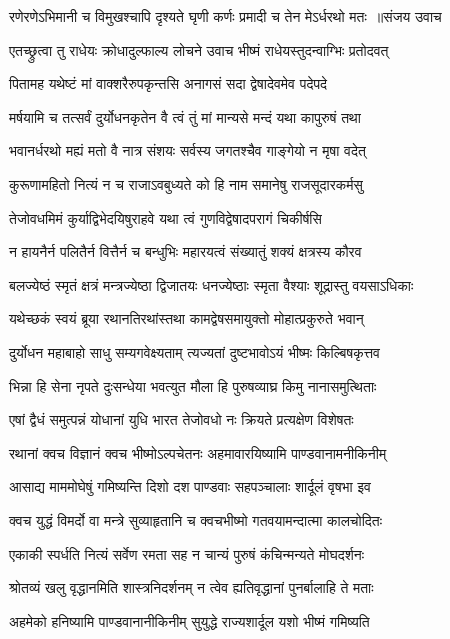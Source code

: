 \threelineshloka
{रणेरणेऽभिमानी च विमुखश्चापि दृश्यते}
{घृणी कर्णः प्रमादी च तेन मेऽर्धरथो मतः ॥संजय उवाच}
{}


\twolineshloka
{एतच्छ्रुत्वा तु राधेयः क्रोधादुल्फाल्य लोचने}
{उवाच भीष्मं राधेयस्तुदन्वाग्भिः प्रतोदवत्}


\twolineshloka
{पितामह यथेष्टं मां वाक्शरैरुपकृन्तसि}
{अनागसं सदा द्वेषादेवमेव पदेपदे}


\twolineshloka
{मर्षयामि च तत्सर्वं दुर्योधनकृतेन वै}
{त्वं तुं मां मान्यसे मन्दं यथा कापुरुषं तथा}


\twolineshloka
{भवानर्धरथो मह्यं मतो वै नात्र संशयः}
{सर्वस्य जगतश्चैव गाङ्गेयो न मृषा वदेत्}


\twolineshloka
{कुरूणामहितो नित्यं न च राजाऽवबुध्यते}
{को हि नाम समानेषु राजसूदारकर्मसु}


\twolineshloka
{तेजोवधमिमं कुर्याद्विभेदयिषुराहवे}
{यथा त्वं गुणविद्वेषादपरागं चिकीर्षसि}


\twolineshloka
{न हायनैर्न पलितैर्न वित्तैर्न च बन्धुभिः}
{महारयत्वं संख्यातुं शक्यं क्षत्रस्य कौरव}


\twolineshloka
{बलज्येष्ठं स्मृतं क्षत्रं मन्त्रज्येष्ठा द्विजातयः}
{धनज्येष्ठाः स्मृता वैश्याः शूद्रास्तु वयसाऽधिकाः}


\twolineshloka
{यथेच्छकं स्वयं ब्रूया रथानतिरथांस्तथा}
{कामद्वेषसमायुक्तो मोहात्प्रकुरुते भवान्}


\twolineshloka
{दुर्योधन महाबाहो साधु सम्यगवेक्ष्यताम्}
{त्यज्यतां दुष्टभावोऽयं भीष्मः किल्बिषकृत्तव}


\twolineshloka
{भिन्ना हि सेना नृपते दुःसन्धेया भवत्युत}
{मौला हि पुरुषव्याघ्र किमु नानासमुत्थिताः}


\twolineshloka
{एषां द्वैधं समुत्पन्नं योधानां युधि भारत}
{तेजोवधो नः क्रियते प्रत्यक्षेण विशेषतः}


\twolineshloka
{रथानां क्वच विज्ञानं क्वच भीष्मोऽल्पचेतनः}
{अहमावारयिष्यामि पाण्डवानामनीकिनीम्}


\twolineshloka
{आसाद्य माममोघेषुं गमिष्यन्ति दिशो दश}
{पाण्डवाः सहपञ्चालाः शार्दूलं वृषभा इव}


\twolineshloka
{क्वच युद्धं विमर्दो वा मन्त्रे सुव्याहृतानि च}
{क्वचभीष्मो गतवयामन्दात्मा कालचोदितः}


\twolineshloka
{एकाकी स्पर्धति नित्यं सर्वेण रमता सह}
{न चान्यं पुरुषं कंचिन्मन्यते मोघदर्शनः}


\twolineshloka
{श्रोतव्यं खलु वृद्धानमिति शास्त्रनिदर्शनम्}
{न त्वेव ह्यतिवृद्धानां पुनर्बालाहि ते मताः}


\twolineshloka
{अहमेको हनिष्यामि पाण्डवानानीकिनीम्}
{सुयुद्धे राज्यशार्दूल यशो भीष्मं गमिष्यति}


